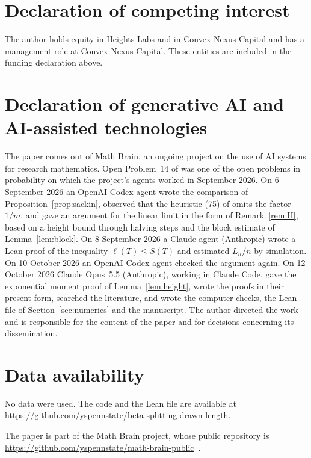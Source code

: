 \documentclass[11pt]{amsart}
\theoremstyle{remark}
\numberwithin{equation}{section}
\begin{document}
\section*{Declaration of competing interest}
The author holds equity in Heights Labs and in Convex Nexus Capital and
has a management role at Convex Nexus Capital. These entities are included
in the funding declaration above.

\section*{Declaration of generative AI and AI-assisted technologies}
The paper comes out of Math Brain, an ongoing project on the use of AI systems for research mathematics. Open Problem~14 of \cite{AJ23} was one of the open problems in probability on which the project's agents worked in September 2026. On 6 September 2026 an OpenAI Codex agent wrote the comparison of Proposition~\ref{prop:sackin}, observed that the heuristic (75) of \cite{AJ23} omits the factor $1/m$, and gave an argument for the linear limit in the form of Remark~\ref{rem:H}, based on a height bound through halving steps and the block estimate of Lemma~\ref{lem:block}. On 8 September 2026 a Claude agent (Anthropic) wrote a Lean proof of the inequality $\ell(T)\le S(T)$ and estimated $L_n/n$ by simulation. On 10 October 2026 an OpenAI Codex agent checked the argument again. On 12 October 2026 Claude Opus~5.5 (Anthropic), working in Claude Code, gave the exponential moment proof of Lemma~\ref{lem:height}, wrote the proofs in their present form, searched the literature, and wrote the computer checks, the Lean file of Section~\ref{sec:numerics} and the manuscript. The author directed the work and is responsible for the content of the paper and for decisions concerning its dissemination.

\section*{Data availability}
No data were used. The code and the Lean file are available at \url{https://github.com/yspennstate/beta-splitting-drawn-length}.

The paper is part of the Math Brain project, whose public repository is \url{https://github.com/yspennstate/math-brain-public}~\cite{MathBrainRepo}.
\end{document}
